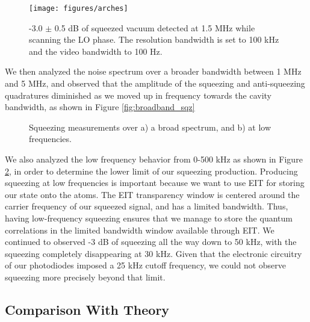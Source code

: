 \begin{figure}[!ht] 
 \centering 
 \texttt{[image: figures/arches]} 
 \caption[Squeezed vacuum at 1.5 MHz with scanned LO phase]{-3.0 $\pm$ 0.5 dB of squeezed vacuum detected at 1.5 MHz while scanning the LO phase.  The resolution bandwidth is set to 100 kHz and the video bandwidth to 100 Hz.} 
 \label{fig:sqz_arches} 
\end{figure} 

We then analyzed the noise spectrum over a broader bandwidth between 1 MHz and 5 MHz, and observed that the amplitude of the squeezing and anti-squeezing quadratures diminished as we moved up in frequency towards the cavity bandwidth, as shown in Figure \ref{fig:broadband_sqz} 

\begin{figure}[!ht]
  \centering
  
  \caption[Broadband and low-frequency squeezing]{Squeezing measurements over a) a broad spectrum, and b) at low frequencies.}
  \label{fig:sqz_broad_low}
\end{figure}
 
We also analyzed the low frequency behavior from 0-500 kHz as shown in Figure
\ref{fig:sqz_broad_low}, in order to determine the lower limit of our squeezing
production.  Producing squeezing at low frequencies is important because we want
to use EIT for storing our state onto the atoms.  The EIT transparency window is
centered around the carrier frequency of our squeezed signal, and has a limited
bandwidth.  Thus, having low-frequency squeezing ensures that we manage to store
the quantum correlations in the limited bandwidth window available through EIT.
We continued to observed -3 dB of squeezing all the way down to 50 kHz, with the
squeezing completely disappearing at 30 kHz.  Given that the electronic
circuitry of our photodiodes imposed a 25 kHz cutoff frequency, we could not observe squeezing more precisely beyond that limit.

\subsection{Comparison With Theory} 
\label{comparison_with_theory} 

